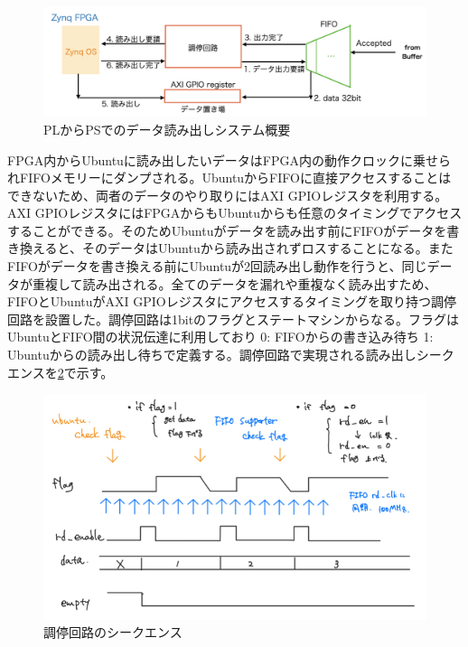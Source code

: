\begin{figure} 
\centering
\includegraphics[width=16cm]{fig/JATHubarbitator.png}
\caption[PLからPSでのデータ読み出しシステム概要]{PLからPSでのデータ読み出しシステム概要}
\label{JATHubarbitor}
\end{figure}

FPGA内からUbuntuに読み出したいデータはFPGA内の動作クロックに乗せられFIFOメモリーにダンプされる。UbuntuからFIFOに直接アクセスすることはできないため、両者のデータのやり取りにはAXI GPIOレジスタを利用する。
AXI GPIOレジスタにはFPGAからもUbuntuからも任意のタイミングでアクセスすることができる。そのためUbuntuがデータを読み出す前にFIFOがデータを書き換えると、そのデータはUbuntuから読み出されずロスすることになる。またFIFOがデータを書き換える前にUbuntuが2回読み出し動作を行うと、同じデータが重複して読み出される。全てのデータを漏れや重複なく読み出すため、FIFOとUbuntuがAXI GPIOレジスタにアクセスするタイミングを取り持つ調停回路を設置した。調停回路は1bitのフラグとステートマシンからなる。フラグはUbuntuとFIFO間の状況伝達に利用しており 0: FIFOからの書き込み待ち 1: Ubuntuからの読み出し待ちで定義する。調停回路で実現される読み出しシークエンスを\ref{JATHubarbitation}で示す。
\begin{figure} 
\centering
\includegraphics[width=16cm]{fig/JATHubarbitation.png}
\caption[調停回路のシークエンス]{調停回路のシークエンス}
\label{JATHubarbitation}
\end{figure}

